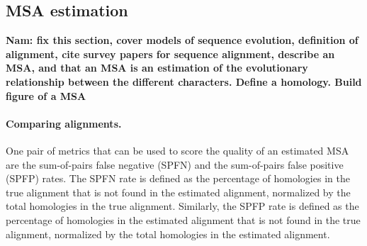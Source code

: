


\subsection{MSA estimation}\label{back:alignment}
\textbf{Nam:  fix this section, cover models of sequence evolution, definition of alignment, cite survey papers for sequence alignment, describe an MSA, and that an MSA is an estimation of the evolutionary relationship between the different characters.  Define a homology.  Build figure of a MSA}

\paragraph{Comparing alignments.}  One pair of metrics that can be used to score the quality of an estimated MSA are the sum-of-pairs false negative (SPFN) and the sum-of-pairs false positive (SPFP) rates.  The SPFN rate is defined as the percentage of homologies in the true alignment that is not found in the estimated alignment, normalized by the total homologies in the true alignment.  Similarly, the SPFP rate is defined as the percentage of homologies in the estimated alignment that is not found in the true alignment, normalized by the total homologies in the estimated alignment.  

